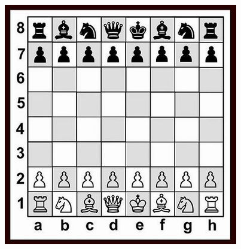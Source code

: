 \documentclass[12pt, a4paper]{article}
\begin{document}
\begin{center}
\includegraphics[scale=0.5]{Listas do PIC/xadrez.jpg}
\end{center}
\end{document}

